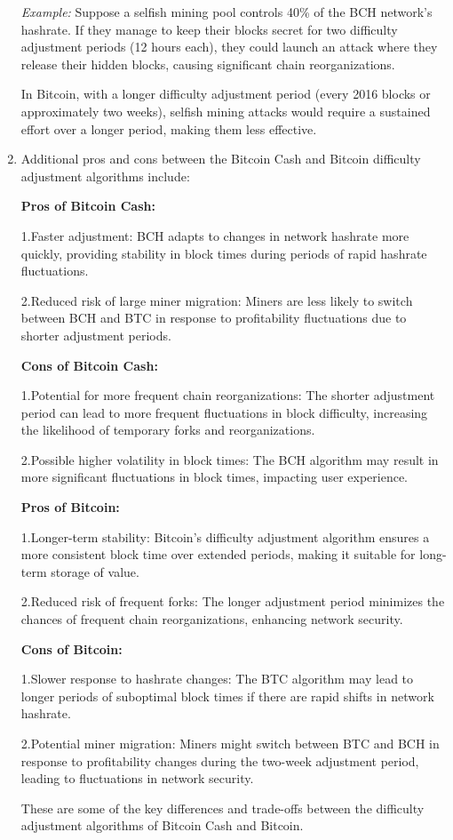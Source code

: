 \documentclass{article}
\begin{document}
\begin{enumerate}
\emph{Example:}
Suppose a selfish mining pool controls 40\% of the BCH network's hashrate. If they manage to keep their blocks secret for two difficulty adjustment periods (12 hours each), they could launch an attack where they release their hidden blocks, causing significant chain reorganizations.

In Bitcoin, with a longer difficulty adjustment period (every 2016 blocks or approximately two weeks), selfish mining attacks would require a sustained effort over a longer period, making them less effective.

\item Additional pros and cons between the Bitcoin Cash and Bitcoin difficulty adjustment algorithms include:

\textbf{Pros of Bitcoin Cash:}

1.Faster adjustment: BCH adapts to changes in network hashrate more quickly, providing stability in block times during periods of rapid hashrate fluctuations.

2.Reduced risk of large miner migration: Miners are less likely to switch between BCH and BTC in response to profitability fluctuations due to shorter adjustment periods.

\textbf{Cons of Bitcoin Cash:}

1.Potential for more frequent chain reorganizations: The shorter adjustment period can lead to more frequent fluctuations in block difficulty, increasing the likelihood of temporary forks and reorganizations.

2.Possible higher volatility in block times: The BCH algorithm may result in more significant fluctuations in block times, impacting user experience.

\textbf{Pros of Bitcoin:}

1.Longer-term stability: Bitcoin's difficulty adjustment algorithm ensures a more consistent block time over extended periods, making it suitable for long-term storage of value.

2.Reduced risk of frequent forks: The longer adjustment period minimizes the chances of frequent chain reorganizations, enhancing network security.

\textbf{Cons of Bitcoin:}

1.Slower response to hashrate changes: The BTC algorithm may lead to longer periods of suboptimal block times if there are rapid shifts in network hashrate.

2.Potential miner migration: Miners might switch between BTC and BCH in response to profitability changes during the two-week adjustment period, leading to fluctuations in network security.

These are some of the key differences and trade-offs between the difficulty adjustment algorithms of Bitcoin Cash and Bitcoin.
\end{enumerate}
\end{document}

